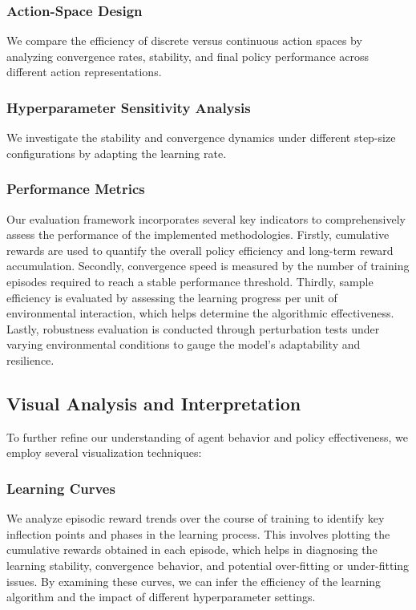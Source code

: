 \documentclass[../CSC_52081_EP.tex]{subfiles}
\begin{document}
\subsubsection{Action-Space Design}
We compare the efficiency of discrete versus continuous action spaces by analyzing convergence rates, stability, and final policy performance across different action representations.

\subsubsection{Hyperparameter Sensitivity Analysis}
We investigate the stability and convergence dynamics under different step-size configurations by adapting the learning rate.

\subsubsection{Performance Metrics}
Our evaluation framework incorporates several key indicators to comprehensively assess the performance of the implemented methodologies. Firstly, cumulative rewards are used to quantify the overall policy efficiency and long-term reward accumulation. Secondly, convergence speed is measured by the number of training episodes required to reach a stable performance threshold. Thirdly, sample efficiency is evaluated by assessing the learning progress per unit of environmental interaction, which helps determine the algorithmic effectiveness. Lastly, robustness evaluation is conducted through perturbation tests under varying environmental conditions to gauge the model's adaptability and resilience.


\subsection{Visual Analysis and Interpretation}
To further refine our understanding of agent behavior and policy effectiveness, we employ several visualization techniques:

\subsubsection{Learning Curves}
We analyze episodic reward trends over the course of training to identify key inflection points and phases in the learning process. This involves plotting the cumulative rewards obtained in each episode, which helps in diagnosing the learning stability, convergence behavior, and potential over-fitting or under-fitting issues. By examining these curves, we can infer the efficiency of the learning algorithm and the impact of different hyperparameter settings.
\end{document}
